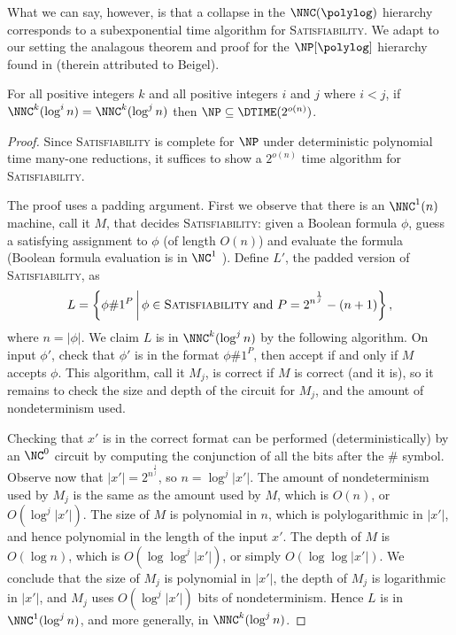 \documentclass[]{article}
\begin{document}
What we can say, however, is that a collapse in the $\NNC(\polylog)$ hierarchy corresponds to a subexponential time algorithm for \textsc{Satisfiability}.
We adapt to our setting the analagous theorem and proof for the $\NP[\polylog]$ hierarchy found in \cite[Theorem~1]{dt90} (therein attributed to Beigel).
\begin{theorem}\label{thm:collapse}
  For all positive integers $k$ and all positive integers $i$ and $j$ where $i < j$, if $\NNC^k(\log^i n) = \NNC^k(\log^j n)$ then $\NP \subseteq \DTIME(2^{o(n)})$.
\end{theorem}
\begin{proof}
  Since \textsc{Satisfiability} is complete for $\NP$ under deterministic polynomial time many-one reductions, it suffices to show a $2^{o(n)}$ time algorithm for \textsc{Satisfiability}.

  The proof uses a padding argument.
  First we observe that there is an $\NNC^1(n)$ machine, call it $M$, that decides \textsc{Satisfiability}: given a Boolean formula $\phi$, guess a satisfying assignment to $\phi$ (of length $O(n)$) and evaluate the formula (Boolean formula evaluation is in $\NC^1$ \cite{buss87}).
  Define $L'$, the padded version of \textsc{Satisfiability}, as
  \begin{equation*}
    L = \left\{ \phi \# 1^P \, \middle| \, \phi \in \textsc{Satisfiability} \text{ and } P = 2^{n^\frac{1}{j}} - (n + 1) \right\},
  \end{equation*}
  where $n = |\phi|$.
  We claim $L$ is in $\NNC^k(\log^j n)$ by the following algorithm.
  On input $\phi'$, check that $\phi'$ is in the format $\phi \# 1^P$, then accept if and only if $M$ accepts $\phi$.
  This algorithm, call it $M_j$, is correct if $M$ is correct (and it is), so it remains to check the size and depth of the circuit for $M_j$, and the amount of nondeterminism used.

  Checking that $x'$ is in the correct format can be performed (deterministically) by an $\NC^0$ circuit by computing the conjunction of all the bits after the $\#$ symbol.
  Observe now that $|x'| = 2^{n^{\frac{1}{j}}}$, so $n = \log^j{|x'|}$.
  The amount of nondeterminism used by $M_j$ is the same as the amount used by $M$, which is $O(n)$, or $O(\log^j |x'|)$.
  The size of $M$ is polynomial in $n$, which is polylogarithmic in $|x'|$, and hence polynomial in the length of the input $x'$.
  The depth of $M$ is $O(\log n)$, which is $O(\log \log^j |x'|)$, or simply $O(\log \log |x'|)$.
  We conclude that the size of $M_j$ is polynomial in $|x'|$, the depth of $M_j$ is logarithmic in $|x'|$, and $M_j$ uses $O(\log^j |x'|)$ bits of nondeterminism.
  Hence $L$ is in $\NNC^1(\log^j n)$, and more generally, in $\NNC^k(\log^j n)$.


\end{proof}
\end{document}

